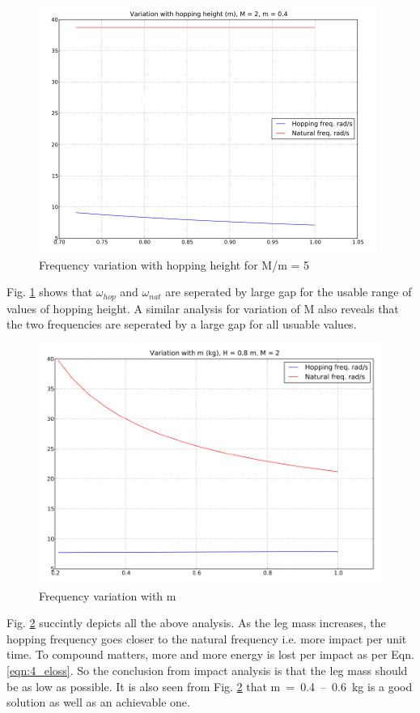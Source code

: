 \begin{figure}[!h]
\centering
\includegraphics[scale=1.5]{fig/freq_hopheight.pdf}
\caption{Frequency variation with hopping height for M/m = 5}
\label{fig:4_freq_height}
\end{figure}
Fig. \ref{fig:4_freq_height} shows that $\omega_{hop}$ and $\omega_{nat}$ are seperated by large gap for the usable range
of values of hopping height. A similar analysis for variation of M also reveals that the two frequencies are seperated
by a large gap for all usuable values.
\begin{figure}[!h]
\centering
\includegraphics[scale=1.5]{fig/freq_m.pdf}
\caption{Frequency variation with m}
\label{fig:4_freq_m}
\end{figure}
Fig. \ref{fig:4_freq_m} succintly depicts all the above analysis. As the leg mass increases, the hopping frequency goes
closer to the natural frequency i.e. more impact per unit time. To compound matters, more and more energy is lost per impact
as per Eqn. \ref{eqn:4_eloss}. So the conclusion from impact analysis is that the leg mass should be as low as possible. It is also
seen from Fig. \ref{fig:4_freq_m} that \mbox{m = 0.4 -- 0.6 kg} is a good solution as well as an achievable one. 

